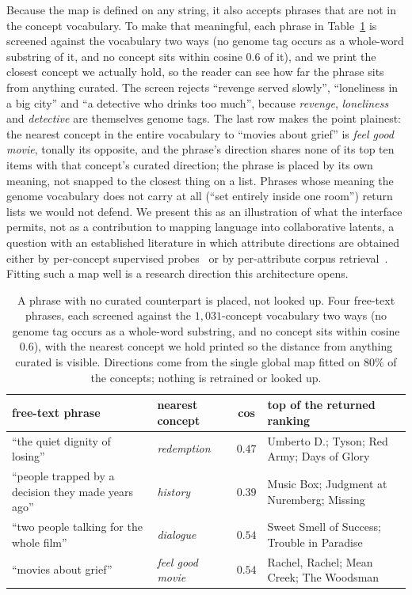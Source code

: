 \documentclass[acmsmall,review,anonymous]{acmart}
\begin{document}
Because the map is defined on any string, it also accepts phrases that are not in the concept vocabulary. To make that meaningful, each phrase in Table~\ref{tab:freetext} is screened against the vocabulary two ways (no genome tag occurs as a whole-word substring of it, and no concept sits within cosine $0.6$ of it), and we print the closest concept we actually hold, so the reader can see how far the phrase sits from anything curated. The screen rejects ``revenge served slowly'', ``loneliness in a big city'' and ``a detective who drinks too much'', because \emph{revenge}, \emph{loneliness} and \emph{detective} are themselves genome tags. The last row makes the point plainest: the nearest concept in the entire vocabulary to ``movies about grief'' is \emph{feel good movie}, tonally its opposite, and the phrase's direction shares none of its top ten items with that concept's curated direction; the phrase is placed by its own meaning, not snapped to the closest thing on a list. Phrases whose meaning the genome vocabulary does not carry at all (``set entirely inside one room'') return lists we would not defend. We present this as an illustration of what the interface permits, not as a contribution to mapping language into collaborative latents, a question with an established literature in which attribute directions are obtained either by per-concept supervised probes~\citep{gopfert2024cav,biyik2023soft} or by per-attribute corpus retrieval~\citep{balog2021softattr}. Fitting such a map well is a research direction this architecture opens.

\begin{table}[t]\centering\small
\setlength{\tabcolsep}{5pt}
\begin{tabular}{p{4.2cm}p{2.0cm}c p{5.4cm}}
\toprule
free-text phrase & nearest concept & cos & top of the returned ranking \\
\midrule
``the quiet dignity of losing'' & \emph{redemption} & $0.47$ & Umberto D.; Tyson; Red Army; Days of Glory \\
``people trapped by a decision they made years ago'' & \emph{history} & $0.39$ & Music Box; Judgment at Nuremberg; Missing \\
``two people talking for the whole film'' & \emph{dialogue} & $0.54$ & Sweet Smell of Success; Trouble in Paradise \\
``movies about grief'' & \emph{feel good movie} & $0.54$ & Rachel, Rachel; Mean Creek; The Woodsman \\
\bottomrule
\end{tabular}
\caption{A phrase with no curated counterpart is placed, not looked up. Four free-text phrases, each screened against the $1{,}031$-concept vocabulary two ways (no genome tag occurs as a whole-word substring, and no concept sits within cosine $0.6$), with the nearest concept we hold printed so the distance from anything curated is visible. Directions come from the single global map fitted on $80\%$ of the concepts; nothing is retrained or looked up.}
\label{tab:freetext}
\end{table}
\end{document}
